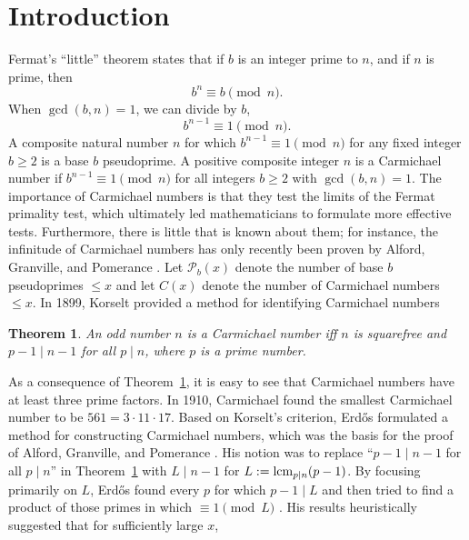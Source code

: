 \documentclass[11pt]{article}
\theoremstyle{plain}
\newtheorem{theorem}[subsubsection]{Theorem}
\theoremstyle{definition}
\theoremstyle{remark}
\numberwithin{equation}{subsection}
\begin{document}
\section{Introduction}
Fermat's ``little'' theorem states that if $b$ is an integer prime to $n$, and if $n$ is prime, then
\begin{equation} \label{1}
b^{n} \equiv b \pmod n.
\end{equation}
When $\gcd(b,n) = 1$, we can divide by $b$,
\begin{equation} \label{2}
b^{n-1} \equiv 1 \pmod n.
\end{equation}
A composite natural number $n$ for which $b^{n-1} \equiv 1 \pmod n$ for any fixed integer $b \ge 2$ is a base $b$ pseudoprime. A positive composite integer $n$ is a Carmichael number if $b^{n-1} \equiv 1 \pmod n$ for all integers $b \ge 2$ with $\gcd(b,n)=1$. The importance of Carmichael numbers is that they test the limits of the Fermat primality test, which ultimately led mathematicians to formulate more effective tests. Furthermore, there is little that is known about them; for instance, the infinitude of Carmichael numbers has only recently been proven by Alford, Granville, and Pomerance \cite{15}. \newline
\indent Let $\mathscr{P}_{b}(x)$ denote the number of base $b$ pseudoprimes $\le x$ and let $C(x)$ denote the number of Carmichael numbers $\le x$. In 1899, Korselt \cite{20} provided a method for identifying Carmichael numbers
\begin{theorem} \label{theorem1}
An odd number $n$ is a Carmichael number iff $n$ is squarefree and $p-1 \mid n-1$ for all $p \mid n$, where $p$ is a prime number.
\end{theorem}
As a consequence of Theorem~\ref{theorem1}, it is easy to see that Carmichael numbers have at least three prime factors. \newline
\indent In 1910, Carmichael \cite{22} found the smallest Carmichael number to be $561 = 3 \cdot 11 \cdot 17$. \newline
\indent Based on Korselt's criterion, Erd\H{o}s \cite{17} formulated a method for constructing Carmichael numbers, which was the basis for the proof of Alford, Granville, and Pomerance \cite{15}. His notion was to replace ``$p-1 \mid n-1$ for all $p \mid n$'' in Theorem~\ref{theorem1} with $L \mid n-1$ for $L:={\rm lcm\/}_{p\mid n}(p-1)$. By focusing primarily on $L$, Erd\H{o}s found every $p$ for which $p-1 \mid L$ and then tried to find a product of those primes in which $\equiv 1 \pmod L$ \cite{8}. His results heuristically suggested that for sufficiently large $x$,
\end{document}
